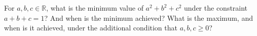 For $a, b, c \in \mathbb{R}$,
what is the minimum value of $a^2 + b^2 + c^2$
under the constraint $a + b + c = 1$?
And when is the minimum achieved?\newline
What is the maximum, and when is it achieved,
under the additional condition that $a, b, c \geq 0$?
